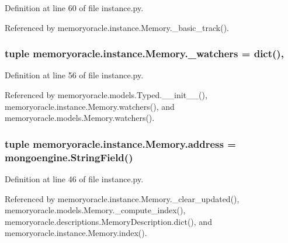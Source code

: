 Definition at line 60 of file instance.\+py.



Referenced by memoryoracle.\+instance.\+Memory.\+\_\+basic\+\_\+track().

\hypertarget{classmemoryoracle_1_1instance_1_1Memory_aeeda16dba7e90242fd4e6e6161d709de}{}
\subsubsection[{\+\_\+watchers}]{\setlength{\rightskip}{0pt plus 5cm}tuple memoryoracle.\+instance.\+Memory.\+\_\+watchers = dict()\hspace{0.3cm}{\ttfamily [static]}, {\ttfamily [private]}}\label{classmemoryoracle_1_1instance_1_1Memory_aeeda16dba7e90242fd4e6e6161d709de}


Definition at line 56 of file instance.\+py.



Referenced by memoryoracle.\+models.\+Typed.\+\_\+\+\_\+init\+\_\+\+\_\+(), memoryoracle.\+instance.\+Memory.\+watchers(), and memoryoracle.\+models.\+Memory.\+watchers().

\hypertarget{classmemoryoracle_1_1instance_1_1Memory_a168ebce820209761e54c983c16bcd88f}{}
\subsubsection[{address}]{\setlength{\rightskip}{0pt plus 5cm}tuple memoryoracle.\+instance.\+Memory.\+address = mongoengine.\+String\+Field()\hspace{0.3cm}{\ttfamily [static]}}\label{classmemoryoracle_1_1instance_1_1Memory_a168ebce820209761e54c983c16bcd88f}


Definition at line 46 of file instance.\+py.



Referenced by memoryoracle.\+instance.\+Memory.\+\_\+clear\+\_\+updated(), memoryoracle.\+models.\+Memory.\+\_\+compute\+\_\+index(), memoryoracle.\+descriptions.\+Memory\+Description.\+dict(), and memoryoracle.\+instance.\+Memory.\+index().


